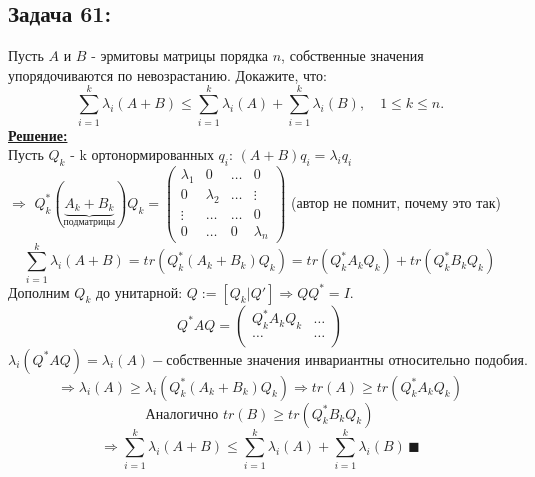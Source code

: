 \documentclass[a4paper,12pt,titlepage,final]{article}
\begin{document}
\subsection*{Задача 61:}
\noindent Пусть $A$ и $B$ - эрмитовы матрицы порядка $n$, собственные значения упорядочиваются по невозрастанию. Докажите, что:\\
$$ \sum_{i=1}^{k}\lambda_{i}(A + B) \leq \sum_{i=1}^{k}\lambda_{i}(A) + \sum_{i=1}^{k}\lambda_{i}(B), \quad 1 \leq k \leq n. $$
\textbf{\underline{Решение:}} \\
Пусть $Q_k$ - k ортонормированных $q_i$: $(A + B)q_i = \lambda_i q_i$ \\
$\Rightarrow$ $Q^*_k(\underbrace{A_k + B_k}_{\text{подматрицы}})Q_k = \begin{pmatrix}
                                \lambda_1 & 0 & \ldots & 0 \\
                                0 & \lambda_2 & \ldots & \vdots\\
                                \vdots & \ldots & \ldots & 0\\
                                0 & \ldots & 0 & \lambda_n
                            \end{pmatrix}$ (\small автор не помнит, почему это так) \\
$$
\sum_{i=1}^{k}\lambda_{i}(A + B) = tr(Q^*_k(A_k + B_k)Q_k) = tr(Q^*_kA_kQ_k) + tr(Q^*_kB_kQ_k)
$$
Дополним $Q_k$ до унитарной: $Q := [Q_k | Q'] \Rightarrow QQ^* = I$.\\
$$Q^*AQ = 
\begin{pmatrix}
    Q^*_kA_kQ_k & \ldots \\
    \ldots & \ldots \\
\end{pmatrix} $$
$$ \lambda_i(Q^*AQ) = \lambda_i(A) - \text{собственные значения инвариантны относительно подобия.}$$
$$\Rightarrow \lambda_i(A) \geq \lambda_i(Q^*_k(A_k + B_k)Q_k) \Rightarrow tr(A) \geq tr(Q^*_kA_kQ_k)$$
$$ \text{Аналогично } tr(B) \geq tr(Q^*_kB_kQ_k)$$
$$\Rightarrow \sum_{i=1}^{k}\lambda_i(A + B) \leq \sum_{i=1}^{k}\lambda_i(A) + \sum_{i=1}^{k}\lambda_i(B) \, \blacksquare$$ \\ \\ \\


\end{document}
